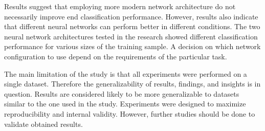 Results suggest that employing more modern network architecture do not necessarily improve end classification performance. However, results also indicate that different neural networks can perform better in different conditions. The two neural network architectures tested in the research showed different classification performance for various sizes of the training sample. A decision on which network configuration to use depend on the requirements of the particular task.

The main limitation of the study is that all experiments were performed on a single dataset. Therefore the generalizability of results, findings, and insights is in question. Results are considered likely to be more generalizable to datasets similar to the one used in the study. Experiments were designed to maximize reproducibility and internal validity. However, further studies should be done to validate obtained results.




